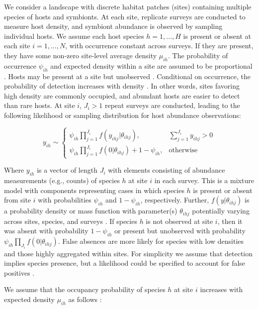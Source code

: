We consider a landscape with discrete habitat patches (sites) containing multiple species of hosts and symbionts.
At each site, replicate surveys are conducted to measure host density, and symbiont abundance is observed by sampling individual hosts.
We assume each host species $h=1, ..., H$ is present or absent at each site $i=1, ..., N$, with occurrence constant across surveys.
If they are present, they have some non-zero site-level average density $\mu_{ih}$.
The probability of occurrence $\psi_{ih}$ and expected density within a site are assumed to be proportional \citep{He2003}.
Hosts may be present at a site but unobserved \citep{MacKenzie2002}.
Conditional on occurrence, the probability of detection increases with density \citep{Royle2005}.
In other words, sites favoring high density are commonly occupied, and abundant hosts are easier to detect than rare hosts.
At site $i$, $J_i > 1$ repeat surveys are conducted, leading to the following likelihood or sampling distribution for host abundance observations:

\begin{equation*}
y_{ih} \sim \begin{cases}
  \psi_{ih} \prod \limits_{j=1}^{J_i} f(y_{ihj}|\theta_{ihj}), & \sum \limits_{j=1}^{J_i} y_{ihj} > 0 \\
  \psi_{ih} \prod \limits_{j=1}^{J_i}  f(0|\theta_{ihj}) + 1 - \psi_{ih}, &\text{otherwise}
  \end{cases}
\tag{eqn 1}
\end{equation*}

Where $y_{ih}$ is a vector of length $J_i$ with elements consisting of abundance measurements (e.g., counts) of species $h$ at site $i$ in each survey.
This is a mixture model with components representing cases in which species $h$ is present or absent from site $i$ with probabilities $\psi_{ih}$ and $1 - \psi_{ih}$, respectively.
Further, $f(y|\theta_{ihj})$ is a probability density or mass function with parameter(s) $\theta_{ihj}$ potentially varying across sites, species, and surveys \citep{verhoef2007}.
If species $h$ is not observed at site $i$, then it was absent with probability $1-\psi_{ih}$ or present but unobserved with probability $\psi_{ih} \prod_{J_i} f(0|\theta_{ihj})$.
False absences are more likely for species with low densities and those highly aggregated within sites.
For simplicity we assume that detection implies species presence, but a likelihood could be specified to account for false positives \citep{Royle2006a}.

We assume that the occupancy probability of species $h$ at site $i$ increases with expected density $\mu_{ih}$ as follows \citep{He2002}:

